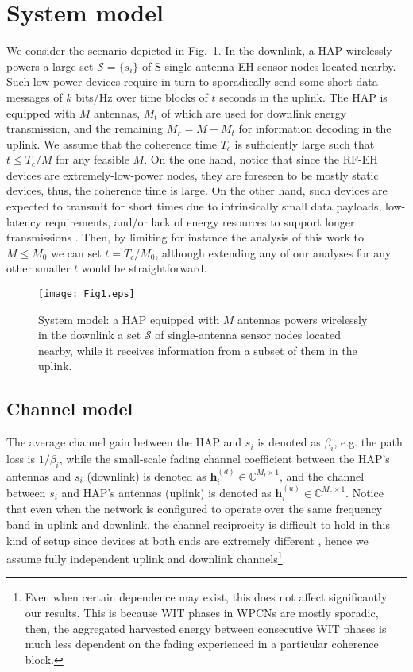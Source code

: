 \documentclass[10pt,journal,a4paper]{IEEEtran}
\begin{document}
	\section{System model}\label{system}
	We consider the scenario depicted in Fig.~\ref{Fig1}. In the downlink, a HAP  wirelessly  powers  a large set $\mathcal{S}=\{s_i\}$ of $\mathrm{S}$ single-antenna EH sensor nodes located nearby. Such low-power devices require in turn to sporadically send  some short data messages of $k$ bits/Hz over time blocks of $t$ seconds in the uplink. The HAP is equipped with $M$ antennas, $M_t$ of which  are used for downlink energy transmission, and the remaining $M_r=M-M_t$ for information decoding in the uplink.
	We assume that the coherence time $T_c$ is sufficiently large such that $t\le T_c/M$ for any feasible $M$. On the one hand, notice that since the RF-EH devices are extremely-low-power nodes, they are foreseen to be mostly static devices, thus, the coherence time is large. On the other hand, such devices are expected to transmit for short times due to intrinsically small data payloads, low-latency requirements, and/or lack of energy resources to support longer transmissions \cite{Khan.2016}. 
	Then, by limiting for instance the analysis of this work to $M\le M_0$ we can set $t=T_c/M_0$, although extending any of our analyses for any other smaller $t$ would be straightforward.
	\begin{figure}[t!]
		\centering  \texttt{[image: Fig1.eps]}
		\caption{System model: a HAP equipped with $M$ antennas powers wirelessly in the downlink a set $\mathcal{S}$ of single-antenna sensor nodes located nearby, while it receives information from a subset of them in the uplink.}	
		\label{Fig1}
	\end{figure}
	\subsection{Channel model}
	The average channel gain between the HAP and $s_i$ is denoted as $\beta_i$, e.g. the path loss is $1/\beta_i$, while the small-scale fading channel coefficient between the HAP's antennas and $s_i$ (downlink) is denoted as  $\mathbf{h}^{(d)}_i\in\mathbb{C}^{M_t\times 1}$, and the channel between $s_i$ and HAP's antennas (uplink) is denoted as $\mathbf{h}^{(u)}_i\in\mathbb{C}^{M_r\times 1}$. Notice that even when the network is configured to operate over the same frequency band in uplink and downlink, the channel reciprocity is difficult to hold in this kind of setup since devices at both ends are extremely different \cite{Guillaud.2005}, hence we assume fully independent uplink and downlink channels\footnote{Even when certain dependence may exist, this does not affect significantly our results. This is because WIT phases in WPCNs are mostly sporadic, then, the aggregated harvested energy between consecutive WIT phases is much less dependent on the fading experienced in a particular coherence block.}. 
	
\end{document}
